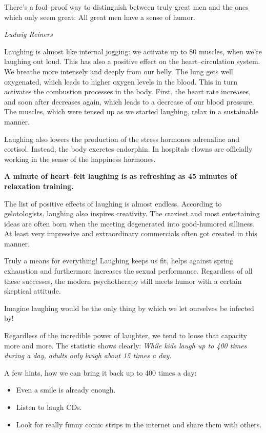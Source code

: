 \documentclass[../main.tex]{subfiles}
\begin{document}
\epigraph{There's a fool--proof way to distinguish between truly great men and the ones which only seem great: All great men have a sense of humor.}{\textit{Ludwig Reiners}}

Laughing is almost like internal jogging: we activate up to 80 muscles, when we're laughing out loud.
This has also a positive effect on the heart--circulation system.
We breathe more intensely and deeply from our belly.
The lung gets well oxygenated, which leads to higher oxygen levels in the blood.
This in turn activates the combustion processes in the body.
First, the heart rate increases, and soon after decreases again, which leads to a decrease of our blood pressure.
The muscles, which were tensed up as we started laughing, relax in a sustainable manner.

Laughing also lowers the production of the stress hormones adrenaline and cortisol.
Instead, the body excretes endorphin.
In hospitals clowns are officially working in the sense of the happiness hormones.

\textbf{A minute of heart--felt laughing is as refreshing as 45 minutes of relaxation training.}

The list of positive effects of laughing is almost endless.
According to gelotologists, laughing also inspires creativity.
The craziest and most entertaining ideas are often born when the meeting degenerated into good-humored silliness.
At least very impressive and extraordinary commercials often got created in this manner.

Truly a means for everything!
Laughing keeps us fit, helps against spring exhaustion and furthermore increases the sexual performance.
Regardless of all these successes, the modern psychotherapy still meets humor with a certain skeptical attitude.

Imagine laughing would be the only thing by which we let ourselves be infected by!

Regardless of the incredible power of laughter, we tend to loose that capacity more and more.
The statistic shows clearly: \emph{While kids laugh up to 400 times during a day, adults only laugh about 15 times a day.}

A few hints, how we can bring it back up to 400 times a day:
\begin{itemize}
\item Even a smile is already enough.
\item Listen to laugh CDs.
\item Look for really funny comic strips in the internet and share them with others.
\end{itemize}
\end{document}
